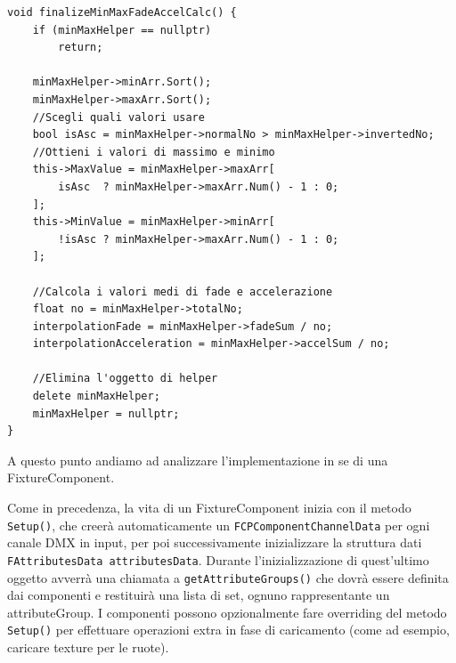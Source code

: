 \documentclass[main.tex]{subfiles}
\begin{document}
\begin{lstlisting}
void finalizeMinMaxFadeAccelCalc() {
    if (minMaxHelper == nullptr)
        return;
    
    minMaxHelper->minArr.Sort();
    minMaxHelper->maxArr.Sort();
    //Scegli quali valori usare
    bool isAsc = minMaxHelper->normalNo > minMaxHelper->invertedNo;
    //Ottieni i valori di massimo e minimo
    this->MaxValue = minMaxHelper->maxArr[
        isAsc  ? minMaxHelper->maxArr.Num() - 1 : 0;
    ];
    this->MinValue = minMaxHelper->minArr[
        !isAsc ? minMaxHelper->maxArr.Num() - 1 : 0;
    ];

    //Calcola i valori medi di fade e accelerazione
    float no = minMaxHelper->totalNo;
    interpolationFade = minMaxHelper->fadeSum / no;
    interpolationAcceleration = minMaxHelper->accelSum / no;

    //Elimina l'oggetto di helper
    delete minMaxHelper;
    minMaxHelper = nullptr;
}
\end{lstlisting}

A questo punto andiamo ad analizzare l'implementazione in se di una FixtureComponent.\newline

Come in precedenza, la vita di un FixtureComponent inizia con il metodo \lstinline{Setup()}, che creerà automaticamente un \lstinline{FCPComponentChannelData} per ogni canale DMX in input, per poi successivamente inizializzare la struttura dati \lstinline{FAttributesData attributesData}. Durante l'inizializzazione di quest'ultimo oggetto avverrà una chiamata a \lstinline{getAttributeGroups()} che dovrà essere definita dai componenti e restituirà una lista di set, ognuno rappresentante un attributeGroup. I componenti possono opzionalmente fare overriding del metodo \lstinline{Setup()} per effettuare operazioni extra in fase di caricamento (come ad esempio, caricare texture per le ruote).
\end{document}
